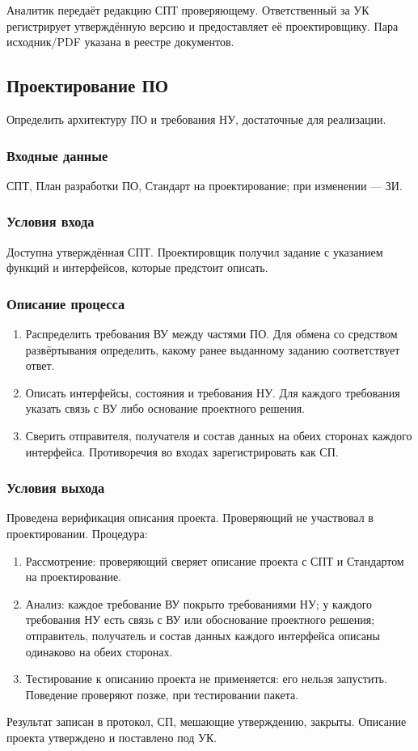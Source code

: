 \documentclass{tpks}
\begin{document}
Аналитик передаёт редакцию СПТ проверяющему. Ответственный за УК регистрирует утверждённую версию и предоставляет её проектировщику. Пара исходник/PDF указана в реестре документов.

\subsection{Проектирование ПО}
Определить архитектуру ПО и требования НУ, достаточные для реализации.

\subsubsection{Входные данные}
СПТ, План разработки ПО, Стандарт на проектирование; при изменении --- ЗИ.

\subsubsection{Условия входа}
Доступна утверждённая СПТ. Проектировщик получил задание с указанием функций и интерфейсов, которые предстоит описать.

\subsubsection{Описание процесса}
\begin{enumerate}
\item Распределить требования ВУ между частями ПО. Для обмена со средством развёртывания определить, какому ранее выданному заданию соответствует ответ.
\item Описать интерфейсы, состояния и требования НУ. Для каждого требования указать связь с ВУ либо основание проектного решения.
\item Сверить отправителя, получателя и состав данных на обеих сторонах каждого интерфейса. Противоречия во входах зарегистрировать как СП.
\end{enumerate}

\subsubsection{Условия выхода}
Проведена верификация описания проекта. Проверяющий не участвовал в проектировании. Процедура:
\begin{enumerate}
\item Рассмотрение: проверяющий сверяет описание проекта с СПТ и Стандартом на проектирование.
\item Анализ: каждое требование ВУ покрыто требованиями НУ; у каждого требования НУ есть связь с ВУ или обоснование проектного решения; отправитель, получатель и состав данных каждого интерфейса описаны одинаково на обеих сторонах.
\item Тестирование к описанию проекта не применяется: его нельзя запустить. Поведение проверяют позже, при тестировании пакета.
\end{enumerate}
Результат записан в протокол, СП, мешающие утверждению, закрыты. Описание проекта утверждено и поставлено под УК.
\end{document}
